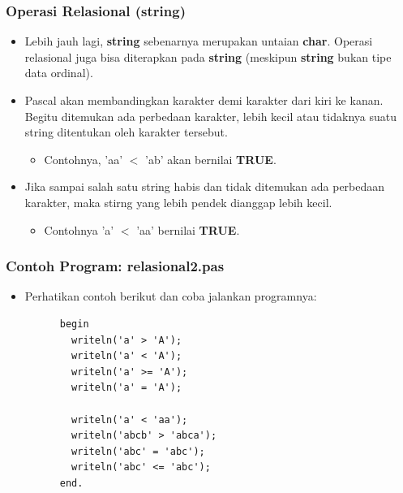 \begin{frame}
\frametitle{Operasi Relasional (string)}
\begin{itemize}
  \item Lebih jauh lagi, \textbf{string} sebenarnya merupakan untaian \textbf{char}. Operasi relasional juga bisa diterapkan pada \textbf{string} (meskipun \textbf{string} bukan tipe data ordinal).
  \item Pascal akan membandingkan karakter demi karakter dari kiri ke kanan. Begitu ditemukan ada perbedaan karakter, lebih kecil atau tidaknya suatu string ditentukan oleh karakter tersebut.
  \begin{itemize}
    \item Contohnya, 'aa' $<$ 'ab' akan bernilai \textbf{TRUE}.
  \end{itemize}
  \item Jika sampai salah satu string habis dan tidak ditemukan ada perbedaan karakter, maka stirng yang lebih pendek dianggap lebih kecil.
  \begin{itemize}
    \item Contohnya 'a' $<$ 'aa' bernilai \textbf{TRUE}.
  \end{itemize}
\end{itemize}
\end{frame}

\begin{frame}[fragile]
\frametitle{Contoh Program: relasional2.pas}
\begin{itemize}
  \item Perhatikan contoh berikut dan coba jalankan programnya:
    \begin{lstlisting}
      begin
        writeln('a' > 'A');
        writeln('a' < 'A');
        writeln('a' >= 'A');
        writeln('a' = 'A');

        writeln('a' < 'aa');
        writeln('abcb' > 'abca');
        writeln('abc' = 'abc');
        writeln('abc' <= 'abc');
      end.
    \end{lstlisting}
\end{itemize}
\end{frame}

